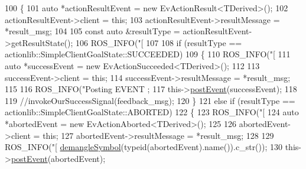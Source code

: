 \begin{DoxyCode}
100     \{
101         \textcolor{keyword}{auto} *actionResultEvent = \textcolor{keyword}{new} EvActionResult<TDerived>();
102         actionResultEvent->client = \textcolor{keyword}{this};
103         actionResultEvent->resultMessage = *result\_msg;
104 
105         \textcolor{keyword}{const} \textcolor{keyword}{auto} &resultType = actionResultEvent->getResultState();
106         ROS\_INFO(\textcolor{stringliteral}{"[%
107 
108         \textcolor{keywordflow}{if} (resultType == actionlib::SimpleClientGoalState::SUCCEEDED)
109         \{
110             ROS\_INFO(\textcolor{stringliteral}{"[%
111             \textcolor{keyword}{auto} *successEvent = \textcolor{keyword}{new} EvActionSucceeded<TDerived>();
112 
113             successEvent->client = \textcolor{keyword}{this};
114             successEvent->resultMessage = *result\_msg;
115 
116             ROS\_INFO(\textcolor{stringliteral}{"Posting EVENT %
      ;
117             this->\hyperlink{classsmacc_1_1ISmaccClient_a46cbc0d695214efe40d29247323bfc80}{postEvent}(successEvent);
118             
119             \textcolor{comment}{//invokeOurSuccessSignal(feedback\_msg);}
120         \}
121         \textcolor{keywordflow}{else} \textcolor{keywordflow}{if} (resultType == actionlib::SimpleClientGoalState::ABORTED)
122         \{
123             ROS\_INFO(\textcolor{stringliteral}{"[%
124             \textcolor{keyword}{auto} *abortedEvent = \textcolor{keyword}{new} EvActionAborted<TDerived>();
125 
126             abortedEvent->client = \textcolor{keyword}{this};
127             abortedEvent->resultMessage = *result\_msg;
128 
129             ROS\_INFO(\textcolor{stringliteral}{"[%
      \hyperlink{namespacesmacc_a458f5e70d468824fbcd66cc7729deaa8}{demangleSymbol}(\textcolor{keyword}{typeid}(abortedEvent).name()).c\_str());
130             this->\hyperlink{classsmacc_1_1ISmaccClient_a46cbc0d695214efe40d29247323bfc80}{postEvent}(abortedEvent);
}}}}}
\end{DoxyCode}
